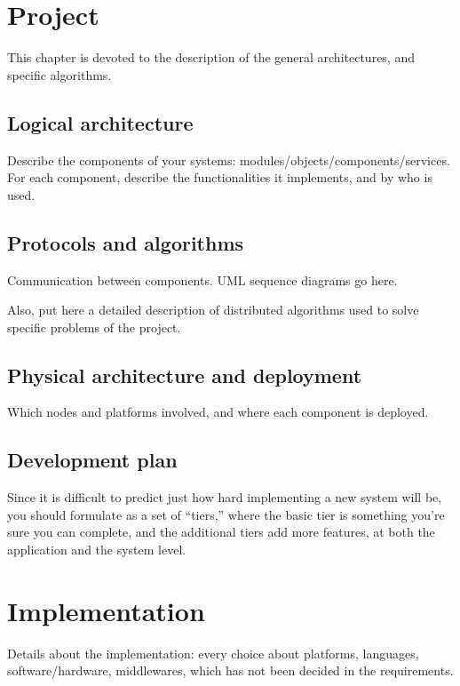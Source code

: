 \documentclass[a4paper, oneside]{memoir}
\begin{document}



\chapter{Project}

This chapter is devoted to the description of the general architectures, and specific algorithms.

\section{Logical architecture}
Describe the components of your systems: modules/objects/components/services.
For each component, describe the functionalities it implements, and by who is used.

\section{Protocols and algorithms}
Communication between components.  UML sequence diagrams go here.

Also, put here a detailed description of distributed algorithms used to solve specific problems of the project.

\section{Physical architecture and deployment}
Which nodes and platforms involved, and where each component is deployed.

\section{Development plan}
Since it is difficult to predict just how hard implementing a new system will be, you should formulate as a set of ``tiers,'' where the basic tier is something you’re sure you can complete, and the additional tiers add more features, at both the application and the system level.

\chapter{Implementation}

Details about the implementation: every choice about platforms, languages, software/hardware, middlewares, which has not been decided in the requirements.
\end{document}
